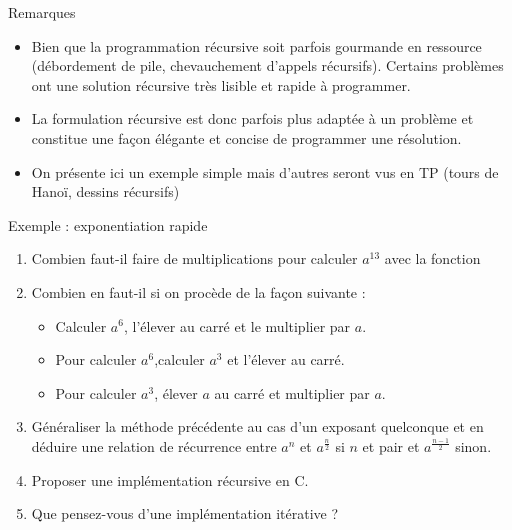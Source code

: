 \documentclass[10pt]{beamer}
\begin{document}
\begin{frame}[fragile]{\Ctitle}{\stitle}
\begin{block}{Remarques}
	\begin{itemize}
	\item<1->Bien que la programmation récursive soit parfois gourmande en ressource (débordement de pile, chevauchement d'appels récursifs). Certains problèmes ont une solution récursive très lisible et rapide à programmer. 
	\item<2-> La formulation récursive est donc parfois \og plus adaptée \fg{} à un problème et constitue une façon élégante et concise de programmer une résolution. 
	\item<3-> On présente ici un exemple simple mais d'autres seront vus en TP (tours de Hanoï, dessins récursifs)
	\end{itemize}
\end{block}
\end{frame}

\begin{frame}[fragile]{\Ctitle}{\stitle}
	\begin{exampleblock}{Exemple : exponentiation rapide}
		\begin{enumerate}
		\item<1-> Combien faut-il faire de multiplications pour calculer $a^{13}$ avec la fonction 
		\item<2-> Combien en faut-il si on procède de la façon suivante :
		\begin{itemize}
			\item<3-> Calculer $a^6$, l'élever au carré et le multiplier par $a$.
			\item<4-> Pour calculer $a^6$,calculer $a^3$ et l'élever au carré.
			\item<5-> Pour calculer $a^3$, élever $a$ au carré et multiplier par $a$.
		\end{itemize}
		\item<6-> Généraliser la méthode précédente au cas d'un exposant quelconque et en déduire une relation de récurrence entre $a^n$ et $a^\frac{n}{2}$ si $n$ et pair et $a^\frac{n-1}{2}$ sinon.
		\item<7-> Proposer une implémentation récursive en C.
		\item<8-> Que pensez-vous d'une implémentation itérative ?
		\end{enumerate}
	\end{exampleblock}
	\end{frame}
\end{document}
